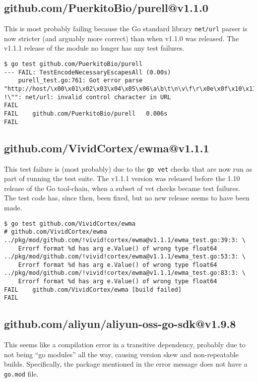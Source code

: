 \documentclass[a4paper]{paper}
\begin{document}
\subsection{github.com/PuerkitoBio/purell@v1.1.0}

This is most probably failing because the Go standard library {\tt net/url}
parser is now stricter (and arguably more correct) than when v1.1.0
was released. The v1.1.1 release of the module no longer has any test
failures.

\begin{verbatim}
$ go test github.com/PuerkitoBio/purell       
--- FAIL: TestEncodeNecessaryEscapesAll (0.00s)
    purell_test.go:761: Got error parse "http://host/\x00\x01\x02\x03\x04\x05\x06\a\b\t\n\v\f\r\x0e\x0f\x10\x11\x12\x13\x14\x15\x16\x17\x18\x19\x1a\x1b\x1c\x1d\x1e\x1f !\"": net/url: invalid control character in URL
FAIL
FAIL	github.com/PuerkitoBio/purell	0.006s
FAIL
\end{verbatim}

\subsection{github.com/VividCortex/ewma@v1.1.1}

This test failure is (most probably) due to the {\tt go vet} checks
that are now run as part of running the test suite. The v1.1.1 version
was released before the 1.10 release of the Go tool-chain, when a
subset of vet checks became test failures. The test code has, since
then, been fixed, but no new release seems to have been made.

\begin{verbatim}
$ go test github.com/VividCortex/ewma
# github.com/VividCortex/ewma
../pkg/mod/github.com/!vivid!cortex/ewma@v1.1.1/ewma_test.go:39:3: \
    Errorf format %d has arg e.Value() of wrong type float64
../pkg/mod/github.com/!vivid!cortex/ewma@v1.1.1/ewma_test.go:53:3: \
    Errorf format %d has arg e.Value() of wrong type float64
../pkg/mod/github.com/!vivid!cortex/ewma@v1.1.1/ewma_test.go:83:3: \
    Errorf format %d has arg e.Value() of wrong type float64
FAIL	github.com/VividCortex/ewma [build failed]
FAIL
\end{verbatim}

\subsection{github.com/aliyun/aliyun-oss-go-sdk@v1.9.8}

This seems like a compilation error in a transitive dependency,
probably due to not being ``go modules'' all the way,
causing version skew and non-repeatable builds. Specifically, the
package mentioned in the error message does not have a {\tt go.mod}
file.
\end{document}
